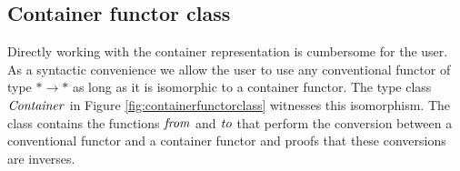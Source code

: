 \subsection{Container functor class}

Directly working with the container representation is cumbersome for
the user. As a syntactic convenience we allow the user to use any
conventional functor of type \ensuremath{\mathbin{*}\to \mathbin{*}} as long as it is isomorphic
to a container functor. The type class \ensuremath{\Conid{Container}} in Figure
\ref{fig:containerfunctorclass} witnesses this isomorphism. The class
contains the functions \ensuremath{\Varid{from}} and \ensuremath{\Varid{to}} that perform the conversion
between a conventional functor and a container functor and proofs that
these conversions are inverses.


